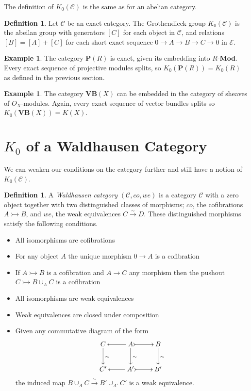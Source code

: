 \documentclass[10pt,a4paper]{article}
\theoremstyle{definition}
\newtheorem{example}[theorem]{Example}
\newtheorem{definition}[theorem]{Definition}
\begin{document}
The definition of $K_0(\mathcal{C})$ is the same as for an abelian category.

\begin{definition}
Let $\mathcal{C}$ be an exact category. The Grothendieck group $K_0(\mathcal{C})$ is the abeilan group with generators $[C]$ for each object in $\mathcal{C}$, and relations $[B] = [A] + [C]$ for each short exact sequence $0 \to A \to B \to C \to 0$ in $\mathcal{E}$.
\end{definition}

\begin{example}
The category $\mathbf{P}(R)$ is exact, given its embedding into $R$-$\mathbf{Mod}$. Every exact sequence of projective modules splits, so $K_0(\mathbf{P}(R)) = K_0(R)$ as defined in the previous section.
\end{example}

\begin{example}
The category $\mathbf{VB}(X)$ can be embedded in the category of sheaves of $O_X$-modules. Again, every exact sequence of vector bundles splits so $K_0(\mathbf{VB}(X)) = K(X)$.
\end{example}

\section{$K_0$ of a Waldhausen Category}

We can weaken our conditions on the category further and still have a notion of $K_0(\mathcal{C})$.

\begin{definition}
A \emph{Waldhausen category} $(\mathcal{C}, co, we)$ is a category $\mathcal{C}$ with a zero object together with two distinguished classes of morphisms; $co$, the cofibrations $A \rightarrowtail B$, and $we$, the weak equivalences $C \xrightarrow{\sim} D$. These distinguished morphisms satisfy the following conditions.
\begin{itemize}
\itemsep0em
\item All isomorphisms are cofibrations
\item For any object $A$ the unique morphism $0 \to A$ is a cofibration
\item If $A \rightarrowtail B$ is a cofibration and $A \to C$ any morphism then the pushout $C \rightarrowtail B \cup_A C$ is a cofibration
\\
\item All isomorphisms are weak equivalences
\item Weak equivalences are closed under composition
\item Given any commutative diagram of the form
\begin{displaymath}
    \xymatrix{
    C \ar[d]^\sim & \ar[l] A \ar[d]^\sim \ar@{>->}[r] & B \ar[d]^\sim \\
    C' & \ar[l] A' \ar@{>->}[r] & B' \\
    }
\end{displaymath}
the induced map $B \cup_A C \xrightarrow{\sim} B' \cup_{A'} C'$ is a weak equivalence.
\end{itemize}
\end{definition}
\end{document}
